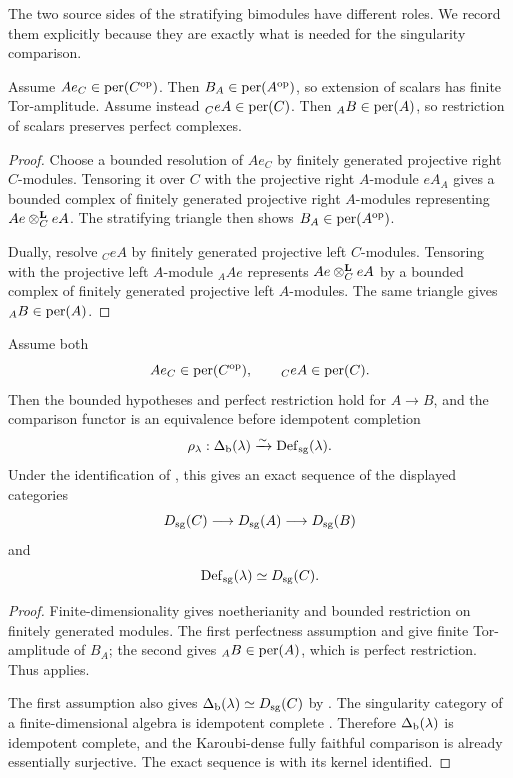 The two source sides of the stratifying bimodules have different roles.  We record them explicitly because they are exactly what is needed for the singularity comparison.

\begin{lemma}\label{lem:stratifying-perfectness}
Assume \(Ae_C\in\operatorname{per}(C^{\mathrm{op}})\).  Then \(B_A\in\operatorname{per}(A^{\mathrm{op}})\), so extension of scalars has finite Tor-amplitude.  Assume instead \({}_CeA\in\operatorname{per}(C)\).  Then \({}_AB\in\operatorname{per}(A)\), so restriction of scalars preserves perfect complexes.
\end{lemma}

\begin{proof}
Choose a bounded resolution of \(Ae_C\) by finitely generated projective right \(C\)-modules.  Tensoring it over \(C\) with the projective right \(A\)-module \(eA_A\) gives a bounded complex of finitely generated projective right \(A\)-modules representing
\(Ae\otimes^{\mathbf L}_CeA\).  The stratifying triangle then shows
\(B_A\in\operatorname{per}(A^{\mathrm{op}})\).

Dually, resolve \({}_CeA\) by finitely generated projective left \(C\)-modules.  Tensoring with the projective left \(A\)-module \({}_AAe\) represents
\(Ae\otimes^{\mathbf L}_CeA\) by a bounded complex of finitely generated projective left \(A\)-modules.  The same triangle gives \({}_AB\in\operatorname{per}(A)\).
\end{proof}

\begin{theorem}\label{thm:stratifying-comparison}
Assume both
\[
 Ae_C\in\operatorname{per}(C^{\mathrm{op}}),
 \qquad
 {}_CeA\in\operatorname{per}(C).
\]
Then the bounded hypotheses and perfect restriction hold for
\(A\to B\), and the comparison functor is an equivalence before idempotent completion
\[
 \rho_\lambda:\Delta_{\mathrm b}(\lambda)
 \xrightarrow{\sim}
 \operatorname{Def}_{\mathrm{sg}}(\lambda).
\]
Under the identification of , this gives an exact sequence of the displayed categories
\[
 D_{\mathrm{sg}}(C)\longrightarrow D_{\mathrm{sg}}(A)\longrightarrow D_{\mathrm{sg}}(B)
\]
and
\[
 \operatorname{Def}_{\mathrm{sg}}(\lambda)\simeq D_{\mathrm{sg}}(C).
\]
\end{theorem}

\begin{proof}
Finite-dimensionality gives noetherianity and bounded restriction on finitely generated modules.  The first perfectness assumption and
 give finite Tor-amplitude of \(B_A\); the second gives \({}_AB\in\operatorname{per}(A)\), which is perfect restriction.  Thus  applies.

The first assumption also gives
\(\Delta_{\mathrm b}(\lambda)\simeq D_{\mathrm{sg}}(C)\) by
.  The singularity category of a finite-dimensional algebra is idempotent complete \cite[Corollary~2.4]{ChenRadicalSquareZero}.  Therefore \(\Delta_{\mathrm b}(\lambda)\) is idempotent complete, and the Karoubi-dense fully faithful comparison is already essentially surjective.  The exact sequence is  with its kernel identified.
\end{proof}

